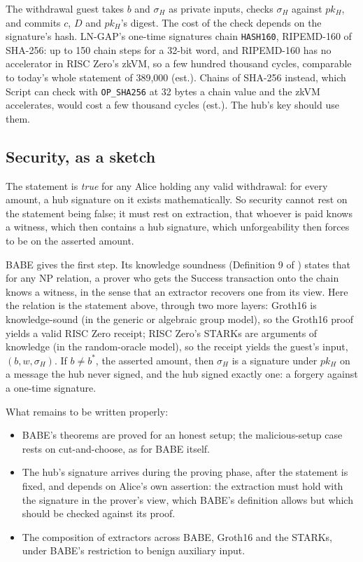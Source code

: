 \documentclass[11pt]{article}
\begin{document}
The withdrawal guest takes $b$ and $\sigma_H$ as private inputs, checks
$\sigma_H$ against $pk_H$, and commits $c$, $D$ and $pk_H$'s digest. The
cost of the check depends on the signature's hash. LN-GAP's one-time
signatures chain \texttt{HASH160}, RIPEMD-160 of SHA-256: up to 150 chain
steps for a 32-bit word, and RIPEMD-160 has no accelerator in RISC
Zero's zkVM, so a few hundred thousand cycles, comparable to today's
whole statement of 389,000 (est.). Chains of SHA-256 instead, which
Script can check with \texttt{OP\_SHA256} at 32 bytes a chain value and
the zkVM accelerates, would cost a few thousand cycles (est.). The hub's
key should use them.

\subsection{Security, as a sketch}
\label{sec:security}

The statement is \emph{true} for any Alice holding any valid withdrawal:
for every amount, a hub signature on it exists mathematically. So
security cannot rest on the statement being false; it must rest on
extraction, that whoever is paid knows a witness, which then contains a
hub signature, which unforgeability then forces to be on the asserted
amount.

BABE gives the first step. Its knowledge soundness (Definition 9 of
\cite{babe}) states that for any NP relation, a prover who gets the
Success transaction onto the chain knows a witness, in the sense that an
extractor recovers one from its view. Here the relation is the
statement above, through two more layers: Groth16 is knowledge-sound
(in the generic or algebraic group model), so the Groth16 proof yields
a valid RISC Zero receipt; RISC Zero's STARKs are arguments of knowledge
(in the random-oracle model), so the receipt yields the guest's input,
$(b, w, \sigma_H)$. If $b \ne b^*$, the asserted amount, then $\sigma_H$
is a signature under $pk_H$ on a message the hub never signed, and the
hub signed exactly one: a forgery against a one-time signature.

What remains to be written properly:
\begin{itemize}[leftmargin=1.5em]
\item BABE's theorems are proved for an honest setup; the malicious-setup
  case rests on cut-and-choose, as for BABE itself.
\item The hub's signature arrives during the proving phase, after the
  statement is fixed, and depends on Alice's own assertion: the
  extraction must hold with the signature in the prover's view, which
  BABE's definition allows but which should be checked against its
  proof.
\item The composition of extractors across BABE, Groth16 and the STARKs,
  under BABE's restriction to benign auxiliary input.
\end{itemize}
\end{document}
